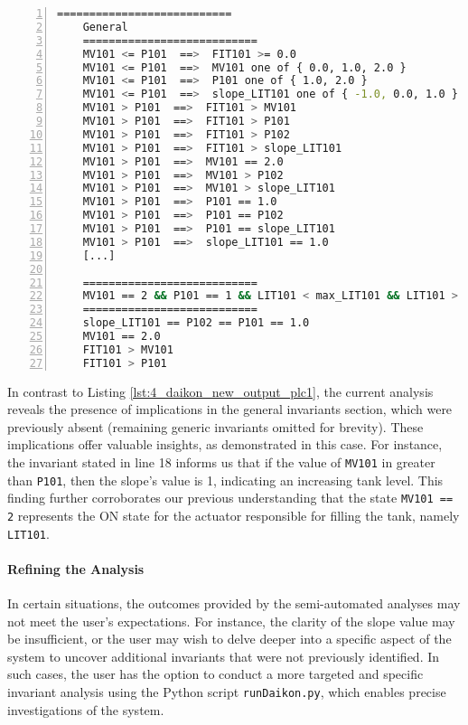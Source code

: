 \begin{lstlisting}[language=bash,numbers=left,caption={Daikon outcomes for the system configuration \texttt{MV101 == 2, P101 == 1} on \texttt{LIT101}},label=lst:4_current_system_config_analysis]
	===========================
	General
	===========================
	MV101 <= P101  ==>  FIT101 >= 0.0
	MV101 <= P101  ==>  MV101 one of { 0.0, 1.0, 2.0 }
	MV101 <= P101  ==>  P101 one of { 1.0, 2.0 }
	MV101 <= P101  ==>  slope_LIT101 one of { -1.0, 0.0, 1.0 }
	MV101 > P101  ==>  FIT101 > MV101
	MV101 > P101  ==>  FIT101 > P101
	MV101 > P101  ==>  FIT101 > P102
	MV101 > P101  ==>  FIT101 > slope_LIT101
	MV101 > P101  ==>  MV101 == 2.0
	MV101 > P101  ==>  MV101 > P102
	MV101 > P101  ==>  MV101 > slope_LIT101
	MV101 > P101  ==>  P101 == 1.0
	MV101 > P101  ==>  P101 == P102
	MV101 > P101  ==>  P101 == slope_LIT101
	MV101 > P101  ==>  slope_LIT101 == 1.0
	[...]
	
	===========================
	MV101 == 2 && P101 == 1 && LIT101 < max_LIT101 && LIT101 > min_LIT101
	===========================
	slope_LIT101 == P102 == P101 == 1.0
	MV101 == 2.0
	FIT101 > MV101
	FIT101 > P101
\end{lstlisting}

\noindent In contrast to Listing \ref{lst:4_daikon_new_output_plc1}, the current analysis reveals the presence of implications in the general invariants section, which were previously absent (remaining generic invariants omitted for brevity). These implications offer valuable insights, as demonstrated in this case. For instance, the invariant stated in line 18 informs us that if the value of \texttt{MV101} in greater than \texttt{P101}, then the slope's value is 1, indicating an increasing tank level. This finding further corroborates our previous understanding that the state \texttt{MV101 == 2} represents the ON state for the actuator responsible for filling the tank, namely \texttt{LIT101}. 

\paragraph{Refining the Analysis}
\label{par:4_refining_analysis}
In certain situations, the outcomes provided by the semi-automated analyses may not meet the user's expectations. For instance, the clarity of the slope value may be insufficient, or the user may wish to delve deeper into a specific aspect of the system to uncover additional invariants that were not previously identified. In such cases, the user has the option to conduct a more targeted and specific invariant analysis using the Python script \texttt{runDaikon.py}, which enables precise investigations of the system.

